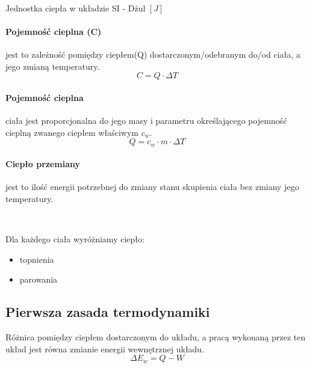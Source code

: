 \documentclass{article}
\begin{document}
                \
                
                Jednostka ciepła w układzie SI - Dżul $[J]$

            \paragraph{Pojemność cieplna (C)} jest to zależność pomiędzy ciepłem(Q)
                dostarczonym/odebranym do/od ciała, a jego zmianą temperatury.
                \begin{equation}
                    C = Q \cdotp \Delta T
                \end{equation}

            \paragraph{Pojemność cieplna} ciała jest proporcjonalna do jego masy
                i parametru określającego pojemność cieplną zwanego ciepłem właściwym $c_w$.
                \begin{equation}
                    Q = c_w \cdotp m \cdotp \Delta T
                \end{equation}

            \paragraph{Ciepło przemiany} jest to ilość energii potrzebnej do zmiany stanu
                skupienia ciała bez zmiany jego temperatury.

                \
                
                Dla każdego ciała wyróżniamy ciepło:
                \begin{itemize}
                    \item topnienia
                    \item parowania
                \end{itemize}

        \subsection{Pierwsza zasada termodynamiki}
            Różnica pomiędzy ciepłem dostarczonym do układu, a pracą wykonaną przez ten 
            układ jest równa zmianie energii wewnętrznej układu.
            \begin{equation}
                \Delta E_w = Q - W
            \end{equation}
\end{document}
